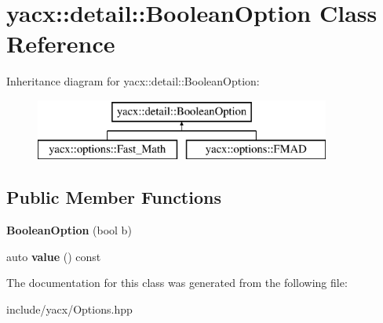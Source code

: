 \hypertarget{classyacx_1_1detail_1_1_boolean_option}{}\section{yacx\+:\+:detail\+:\+:Boolean\+Option Class Reference}
\label{classyacx_1_1detail_1_1_boolean_option}
Inheritance diagram for yacx\+:\+:detail\+:\+:Boolean\+Option\+:\begin{figure}[H]
\begin{center}
\leavevmode
\includegraphics[height=2.000000cm]{classyacx_1_1detail_1_1_boolean_option}
\end{center}
\end{figure}
\subsection*{Public Member Functions}
\begin{DoxyCompactItemize}
\item 
\mbox{\label{classyacx_1_1detail_1_1_boolean_option_a4805b9e0ac55b8b3d24531e8dd768790}} 
{\bfseries Boolean\+Option} (bool b)
\item 
\mbox{\label{classyacx_1_1detail_1_1_boolean_option_aaa668d25a0bf023ec7f6bc0387836c43}} 
auto {\bfseries value} () const
\end{DoxyCompactItemize}


The documentation for this class was generated from the following file\+:\begin{DoxyCompactItemize}
\item 
include/yacx/Options.\+hpp\end{DoxyCompactItemize}
